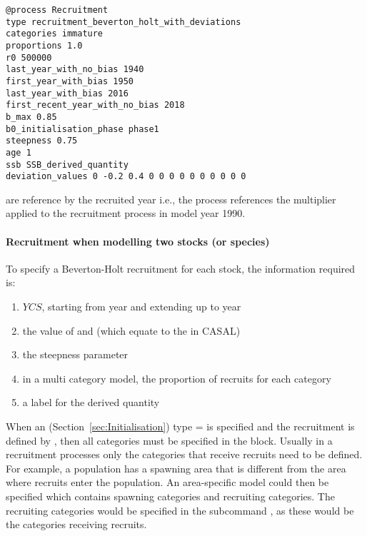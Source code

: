 {\small{\begin{verbatim}
@process Recruitment
type recruitment_beverton_holt_with_deviations
categories immature
proportions 1.0
r0 500000
last_year_with_no_bias 1940
first_year_with_bias 1950
last_year_with_bias 2016
first_recent_year_with_no_bias 2018
b_max 0.85
b0_initialisation_phase phase1
steepness 0.75
age 1
ssb SSB_derived_quantity
deviation_values 0 -0.2 0.4 0 0 0 0 0 0 0 0 0 0
\end{verbatim}}}

 are reference by the recruited year i.e., the  process  references the multiplier applied to the recruitment process in model year 1990.

\paragraph*{Recruitment when modelling two stocks (or species)}

To specify a Beverton-Holt recruitment for each stock, the information required is:

\begin{enumerate}
	\item $YCS$, starting from year  and extending up to year 
	\item the value of  and  (which equate to the  in CASAL)
	\item the steepness parameter 
	\item in a multi category model, the proportion of recruits for each category
	\item a label for the derived quantity
\end{enumerate}

When an  (Section~\ref{sec:Initialisation}) type =  is specified and the recruitment is defined by , then all categories must be specified in the  block. Usually in a recruitment processes only the categories that receive recruits need to be defined. For example, a population has a spawning area that is different from the area where recruits enter the population. An area-specific model could then be specified which contains spawning categories and recruiting categories. The recruiting categories would be specified in the subcommand , as these would be the categories receiving recruits.

